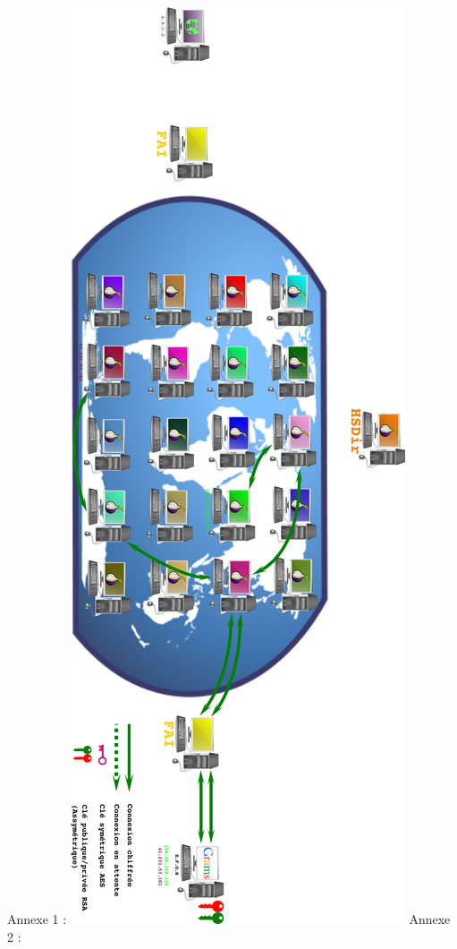 \documentclass[]{article}
\begin{document}
Annexe 1 : \includegraphics{images/Etablissement_circuit.png} Annexe 2 :
\end{document}

